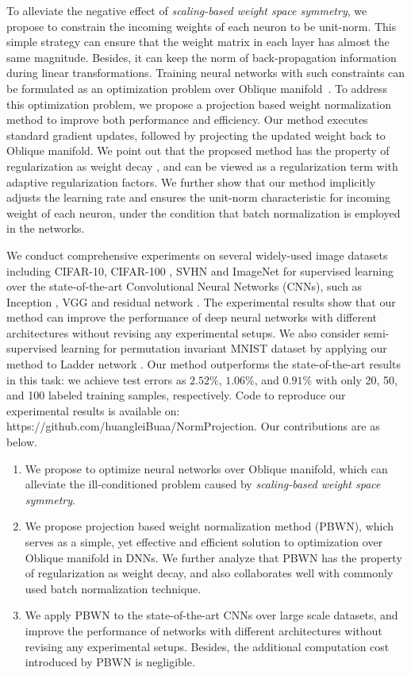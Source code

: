 \documentclass[twocolumn]{article}
\begin{document}
To alleviate the negative effect of \emph{scaling-based weight space symmetry}, we propose to constrain the incoming weights of each neuron to be unit-norm. This simple strategy can ensure that the weight matrix in each layer has almost the same magnitude. Besides, it can keep the norm of back-propagation information during linear transformations. Training neural networks with such constraints can be formulated as an optimization problem over  Oblique manifold~\cite{2006_ICASSP_Absil}. To address this optimization problem, we propose a projection based weight normalization method to improve both performance and efficiency. Our method executes standard gradient updates, followed by projecting the updated weight back to Oblique manifold. We point out that the proposed method has the property of regularization as weight decay \cite{1992_WD_Krogh}, and can be viewed as a regularization term with adaptive regularization factors. We further show that our method implicitly adjusts the learning rate and ensures the unit-norm characteristic for incoming weight of each neuron, under the condition that batch normalization \cite{2015_ICML_Ioffe} is employed in the networks.

We conduct comprehensive experiments on several widely-used image datasets including CIFAR-10, CIFAR-100 \cite{2009_TR_Alex}, SVHN \cite{2011_NIPS_Netzer} and ImageNet \cite{2009_ImageNet} for supervised learning over the state-of-the-art Convolutional Neural Networks (CNNs), such as  Inception \cite{2014_CoRR_Szegedy}, VGG \cite{2014_CoRR_Simonyan} and residual network \cite{2015_CVPR_He,2016_CoRR_Zagoruyko}. The experimental results show that our method can improve the performance of deep neural networks with different architectures without revising any experimental setups. We also consider semi-supervised learning for permutation invariant MNIST dataset by applying our method to Ladder network \cite{2015_NIPS_Rasmus}.
Our method outperforms the state-of-the-art results in this task: we achieve test errors as $2.52\%$, $1.06\%$, and $0.91\%$ with only 20, 50, and 100 labeled training samples, respectively. Code to
reproduce our experimental results is available on: \textcolor[rgb]{0.00,0.50,1.00}{https://github.com/huangleiBuaa/NormProjection}.
Our contributions are as below.
\begin{enumerate}
\item
We propose to optimize neural networks over Oblique manifold, which can alleviate the ill-conditioned problem caused by   \emph{scaling-based weight space symmetry}.
\item
We propose projection based weight normalization method (PBWN), which serves as a simple, yet effective and efficient solution to optimization over Oblique manifold in DNNs. We further analyze that PBWN has the property of regularization as weight decay, and also collaborates well with commonly used batch normalization technique.
\item
We apply PBWN to the state-of-the-art CNNs over large scale datasets, and improve the performance of networks with different architectures without revising any experimental setups. Besides, the additional computation cost introduced by  PBWN is negligible.
\end{enumerate}
\end{document}
